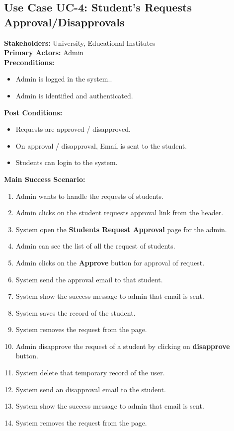 \subsection{Use Case UC-4: Student's Requests Approval/Disapprovals}
\textbf{Stakeholders: } University, Educational Institutes \\
\textbf{Primary Actors: } Admin \\
\textbf{Preconditions:}
\begin{itemize}
\item Admin is logged in the system..
\item Admin is identified and authenticated.
\end{itemize}
\textbf{Post Conditions: }
\begin{itemize}
\item Requests are approved / disapproved.
\item On approval / disapproval, Email is sent to the student.
\item Students can login to the system.
\end{itemize}
\textbf{Main Success Scenario:}
\begin{enumerate}
\item Admin wants to handle the requests of students.
\item Admin clicks on the student requests approval link from the header.
\item System open the \textbf{Students Request Approval} page for the admin.
\item Admin can see the list of all the request of students.
\item Admin clicks on the \textbf{Approve} button for approval of request.
\item System send the approval email to that student.
\item System show the success message to admin that email is sent.
\item System saves the record of the student.
\item System removes the request from the page.
\item Admin disapprove the request of a student by clicking on \textbf{disapprove} button.
\item System delete that temporary record of the user.
\item System send an disapproval email to the student.
\item System show the success message to admin that email is sent.
\item System removes the request from the page.
\end{enumerate}
